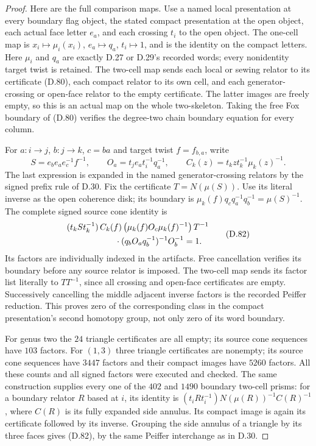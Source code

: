\begin{proof}
Here are the full comparison maps.  Use a named local
presentation at every boundary flag object, the stated
compact presentation at the open object, each actual
face letter $e_a$, and each crossing $t_i$ to the open
object.  The one-cell map is
$x_i\mapsto\mu_i(x_i)$, $e_a\mapsto q_a$, $t_i\mapsto1$,
and is the identity on the compact letters.
Here $\mu_i$ and $q_a$ are exactly D.27 or D.29's
recorded words; every nonidentity target twist is retained.
The two-cell map sends each local or sewing relator
to its certificate (D.80), each compact relator to
its own cell, and each generator-crossing or open-face
relator to the empty certificate.  The latter images
are freely empty, so this is an actual map on the
whole two-skeleton.  Taking the free Fox boundary
of (D.80) verifies the degree-two chain boundary
equation for every column.

For $a:i\to j$, $b:j\to k$, $c=ba$ and target twist
$f=f_{b,a}$, write
\[
 S=e_be_ae_c^{-1}f^{-1},\qquad
 O_a=t_je_at_i^{-1}q_a^{-1},\qquad
 C_k(z)=t_kzt_k^{-1}\mu_k(z)^{-1}.
                                                               \tag{D.81}
\]
The last expression is expanded in the named
generator-crossing relators by the signed prefix
rule of D.30.  Fix the certificate $T=N(\mu(S))$.
Use its literal inverse as the open coherence disk;
its boundary is
$\mu_k(f)q_cq_a^{-1}q_b^{-1}=\mu(S)^{-1}$.
The complete signed source cone identity is
\[
\begin{split}
 &(t_kSt_k^{-1})\,C_k(f)\,
   \bigl(\mu_k(f)O_c\mu_k(f)^{-1}\bigr)\,T^{-1}\\
 &\hspace{20mm}\cdot
   (q_bO_aq_b^{-1})^{-1}O_b^{-1}=1 .
\end{split}                                                     \tag{D.82}
\]
Its factors are individually indexed in the artifacts.
Free cancellation verifies its boundary before any
source relator is imposed.  The two-cell map sends
its factor list literally to $TT^{-1}$, since all
crossing and open-face certificates are empty.
Successively cancelling the middle adjacent inverse
factors is the recorded Peiffer reduction.  This
proves zero of the corresponding class in the
compact presentation's second homotopy group,
not only zero of its word boundary.

For genus two the $24$ triangle certificates are all
empty; its source cone sequences have $103$ factors.
For $(1,3)$ three triangle certificates are nonempty;
its source cone sequences have $3447$ factors and
their compact images have $5260$ factors.
All these counts and all signed factors were executed
and checked.  The same construction supplies every
one of the $402$ and $1490$ boundary two-cell prisms:
for a boundary relator $R$ based at $i$, its identity
is
$(t_iRt_i^{-1})N(\mu(R))^{-1}C(R)^{-1}$,
where $C(R)$ is its fully expanded side annulus.
Its compact image is again its certificate followed
by its inverse.  Grouping the side annulus of a
triangle by its three faces gives (D.82), by the
same Peiffer interchange as in D.30.


\end{proof}
